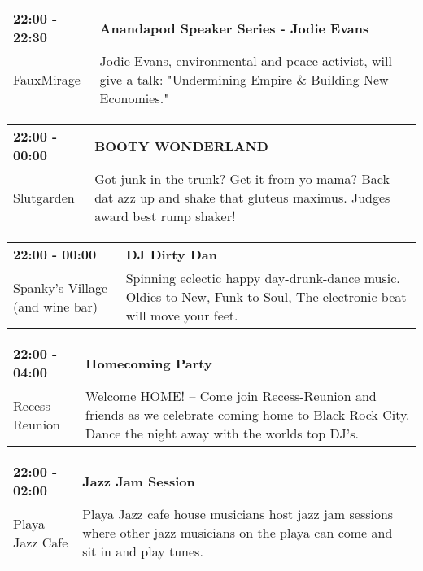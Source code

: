 \begin{tabular}{ p{1in} p{2.2in} }
    \textbf{22:00 - 22:30} & \textbf{Anandapod Speaker Series - Jodie Evans} \\
    FauxMirage \newline  & Jodie Evans, environmental and peace activist, will give a talk: "Undermining Empire \& Building New Economies." \\
    \hline 
\end{tabular}
    
\begin{tabular}{ p{1in} p{2.2in} }
    \textbf{22:00 - 00:00} & \textbf{BOOTY WONDERLAND} \\
    Slutgarden \newline  & Got junk in the trunk? Get it from yo mama? Back dat azz up and shake that gluteus maximus. Judges award best rump shaker! \\
    \hline 
\end{tabular}
    
\begin{tabular}{ p{1in} p{2.2in} }
    \textbf{22:00 - 00:00} & \textbf{DJ Dirty Dan} \\
    Spanky's Village (and wine bar) \newline  & Spinning eclectic happy day-drunk-dance music.  Oldies to New, Funk to Soul, The electronic beat will move your feet. \\
    \hline 
\end{tabular}
    
\begin{tabular}{ p{1in} p{2.2in} }
    \textbf{22:00 - 04:00} & \textbf{Homecoming Party} \\
    Recess-Reunion \newline  & Welcome HOME! -- Come join Recess-Reunion and friends as we celebrate coming home to Black Rock City.  Dance the night away with the worlds top DJ's. \\
    \hline 
\end{tabular}
    
\begin{tabular}{ p{1in} p{2.2in} }
    \textbf{22:00 - 02:00} & \textbf{Jazz Jam Session} \\
    Playa Jazz Cafe \newline  & Playa Jazz cafe house musicians host jazz jam sessions where other jazz musicians on the playa can come and sit in and play tunes. \\
    \hline 
\end{tabular}
    
